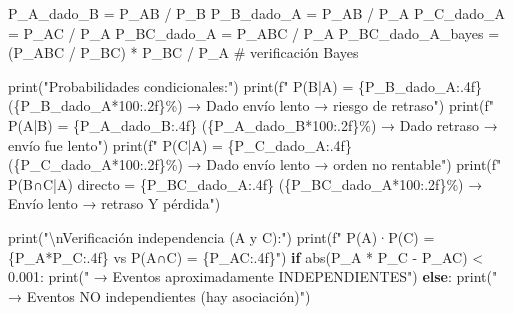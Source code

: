 \documentclass[
  letterpaper,
  DIV=11,
  numbers=noendperiod]{scrartcl}
\newenvironment{Shaded}{\begin{snugshade}}{\end{snugshade}}
\newcommand{\BuiltInTok}[1]{\textcolor[rgb]{0.00,0.23,0.31}{#1}}
\newcommand{\CharTok}[1]{\textcolor[rgb]{0.13,0.47,0.30}{#1}}
\newcommand{\CommentTok}[1]{\textcolor[rgb]{0.37,0.37,0.37}{#1}}
\newcommand{\ControlFlowTok}[1]{\textcolor[rgb]{0.00,0.23,0.31}{\textbf{#1}}}
\newcommand{\DecValTok}[1]{\textcolor[rgb]{0.68,0.00,0.00}{#1}}
\newcommand{\FloatTok}[1]{\textcolor[rgb]{0.68,0.00,0.00}{#1}}
\newcommand{\NormalTok}[1]{\textcolor[rgb]{0.00,0.23,0.31}{#1}}
\newcommand{\OperatorTok}[1]{\textcolor[rgb]{0.37,0.37,0.37}{#1}}
\newcommand{\SpecialCharTok}[1]{\textcolor[rgb]{0.37,0.37,0.37}{#1}}
\newcommand{\SpecialStringTok}[1]{\textcolor[rgb]{0.13,0.47,0.30}{#1}}
\newcommand{\StringTok}[1]{\textcolor[rgb]{0.13,0.47,0.30}{#1}}
\begin{document}
\protect{}\label{bayes-conditional}
\begin{Shaded}
\begin{Highlighting}[]
\NormalTok{P\_A\_dado\_B        }\OperatorTok{=}\NormalTok{ P\_AB }\OperatorTok{/}\NormalTok{ P\_B}
\NormalTok{P\_B\_dado\_A        }\OperatorTok{=}\NormalTok{ P\_AB }\OperatorTok{/}\NormalTok{ P\_A}
\NormalTok{P\_C\_dado\_A        }\OperatorTok{=}\NormalTok{ P\_AC }\OperatorTok{/}\NormalTok{ P\_A}
\NormalTok{P\_BC\_dado\_A       }\OperatorTok{=}\NormalTok{ P\_ABC }\OperatorTok{/}\NormalTok{ P\_A}
\NormalTok{P\_BC\_dado\_A\_bayes }\OperatorTok{=}\NormalTok{ (P\_ABC }\OperatorTok{/}\NormalTok{ P\_BC) }\OperatorTok{*}\NormalTok{ P\_BC }\OperatorTok{/}\NormalTok{ P\_A   }\CommentTok{\# verificación Bayes}

\BuiltInTok{print}\NormalTok{(}\StringTok{"Probabilidades condicionales:"}\NormalTok{)}
\BuiltInTok{print}\NormalTok{(}\SpecialStringTok{f"  P(B|A) = }\SpecialCharTok{\{}\NormalTok{P\_B\_dado\_A}\SpecialCharTok{:.4f\}}\SpecialStringTok{ (}\SpecialCharTok{\{}\NormalTok{P\_B\_dado\_A}\OperatorTok{*}\DecValTok{100}\SpecialCharTok{:.2f\}}\SpecialStringTok{\%) → Dado envío lento → riesgo de retraso"}\NormalTok{)}
\BuiltInTok{print}\NormalTok{(}\SpecialStringTok{f"  P(A|B) = }\SpecialCharTok{\{}\NormalTok{P\_A\_dado\_B}\SpecialCharTok{:.4f\}}\SpecialStringTok{ (}\SpecialCharTok{\{}\NormalTok{P\_A\_dado\_B}\OperatorTok{*}\DecValTok{100}\SpecialCharTok{:.2f\}}\SpecialStringTok{\%) → Dado retraso → envío fue lento"}\NormalTok{)}
\BuiltInTok{print}\NormalTok{(}\SpecialStringTok{f"  P(C|A) = }\SpecialCharTok{\{}\NormalTok{P\_C\_dado\_A}\SpecialCharTok{:.4f\}}\SpecialStringTok{ (}\SpecialCharTok{\{}\NormalTok{P\_C\_dado\_A}\OperatorTok{*}\DecValTok{100}\SpecialCharTok{:.2f\}}\SpecialStringTok{\%) → Dado envío lento → orden no rentable"}\NormalTok{)}
\BuiltInTok{print}\NormalTok{(}\SpecialStringTok{f"  P(B∩C|A) directo = }\SpecialCharTok{\{}\NormalTok{P\_BC\_dado\_A}\SpecialCharTok{:.4f\}}\SpecialStringTok{ (}\SpecialCharTok{\{}\NormalTok{P\_BC\_dado\_A}\OperatorTok{*}\DecValTok{100}\SpecialCharTok{:.2f\}}\SpecialStringTok{\%) → Envío lento → retraso Y pérdida"}\NormalTok{)}

\BuiltInTok{print}\NormalTok{(}\StringTok{"}\CharTok{\textbackslash{}n}\StringTok{Verificación independencia (A y C):"}\NormalTok{)}
\BuiltInTok{print}\NormalTok{(}\SpecialStringTok{f"  P(A)·P(C) = }\SpecialCharTok{\{}\NormalTok{P\_A}\OperatorTok{*}\NormalTok{P\_C}\SpecialCharTok{:.4f\}}\SpecialStringTok{  vs  P(A∩C) = }\SpecialCharTok{\{}\NormalTok{P\_AC}\SpecialCharTok{:.4f\}}\SpecialStringTok{"}\NormalTok{)}
\ControlFlowTok{if} \BuiltInTok{abs}\NormalTok{(P\_A }\OperatorTok{*}\NormalTok{ P\_C }\OperatorTok{{-}}\NormalTok{ P\_AC) }\OperatorTok{\textless{}} \FloatTok{0.001}\NormalTok{:}
    \BuiltInTok{print}\NormalTok{(}\StringTok{"  → Eventos aproximadamente INDEPENDIENTES"}\NormalTok{)}
\ControlFlowTok{else}\NormalTok{:}
    \BuiltInTok{print}\NormalTok{(}\StringTok{"  → Eventos NO independientes (hay asociación)"}\NormalTok{)}
\end{Highlighting}
\end{Shaded}
\end{document}
